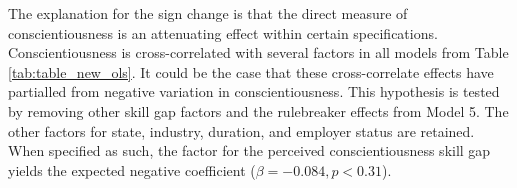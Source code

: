 \documentclass[review]{elsarticle}
\begin{document}
%
The explanation for the sign change is that the direct measure of conscientiousness is an attenuating effect within certain specifications.
Conscientiousness is cross-correlated with several factors in all models from Table \ref{tab:table_new_ols}.
%
It could be the case that these cross-correlate effects have partialled from negative variation in conscientiousness.
This hypothesis is tested by removing other skill gap factors and the rulebreaker effects from Model 5.
The other factors for state, industry, duration, and employer status are retained.
When specified as such, the factor for the perceived conscientiousness skill gap yields the expected negative coefficient ($\beta = -0.084, p < 0.31$).
\end{document}
